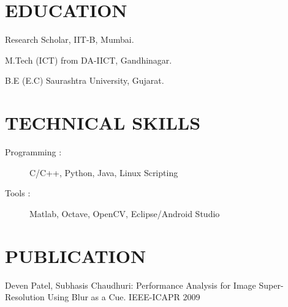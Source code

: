 \documentclass{res}
\begin{document}
\begin{resume}
\section{EDUCATION}          
\begin{description}
 \item    Research Scholar, IIT-B, Mumbai. 
  \item  M.Tech (ICT) from DA-IICT, Gandhinagar.  
   \item     B.E (E.C) Saurashtra University, Gujarat.   
\end{description}    

\section{TECHNICAL SKILLS}          
\begin{description}
\item [Programming      :]  C/C++, Python, Java, Linux Scripting 
\item [Tools            :] Matlab, Octave, OpenCV, Eclipse/Android Studio
\end{description}


\section{PUBLICATION}
\begin{description}
\item   Deven Patel, Subhasis Chaudhuri: Performance Analysis for Image Super-Resolution Using Blur as a Cue. IEEE-ICAPR 2009
\end{description}



 
\end{resume}
\end{document}
